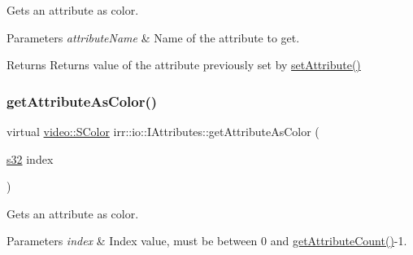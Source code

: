 Gets an attribute as color. 


\begin{DoxyParams}{Parameters}
{\em attribute\+Name} & Name of the attribute to get. \\
\hline
\end{DoxyParams}
\begin{DoxyReturn}{Returns}
Returns value of the attribute previously set by \hyperlink{classirr_1_1io_1_1IAttributes_a03fa31acb481ae23678676cc183f09a6}{set\+Attribute()} 
\end{DoxyReturn}
\mbox{\label{classirr_1_1io_1_1IAttributes_ac3ef831227f7c9383e3e9144ae877c60}} 
\subsubsection{\texorpdfstring{get\+Attribute\+As\+Color()}{getAttributeAsColor()}\hspace{0.1cm}{\footnotesize\ttfamily [2/2]}}
{\footnotesize\ttfamily virtual \hyperlink{classirr_1_1video_1_1SColor}{video\+::\+S\+Color} irr\+::io\+::\+I\+Attributes\+::get\+Attribute\+As\+Color (\begin{DoxyParamCaption}\item[{\hyperlink{namespaceirr_ac66849b7a6ed16e30ebede579f9b47c6}{s32}}]{index }\end{DoxyParamCaption})\hspace{0.3cm}{\ttfamily [pure virtual]}}



Gets an attribute as color. 


\begin{DoxyParams}{Parameters}
{\em index} & Index value, must be between 0 and \hyperlink{classirr_1_1io_1_1IAttributes_a796bdd9440ee7ba0b6742a90a82870b6}{get\+Attribute\+Count()}-\/1. \\
\hline
\end{DoxyParams}
\mbox{\label{classirr_1_1io_1_1IAttributes_ac072aeae816dd06e196eafb910511d2b}} 

